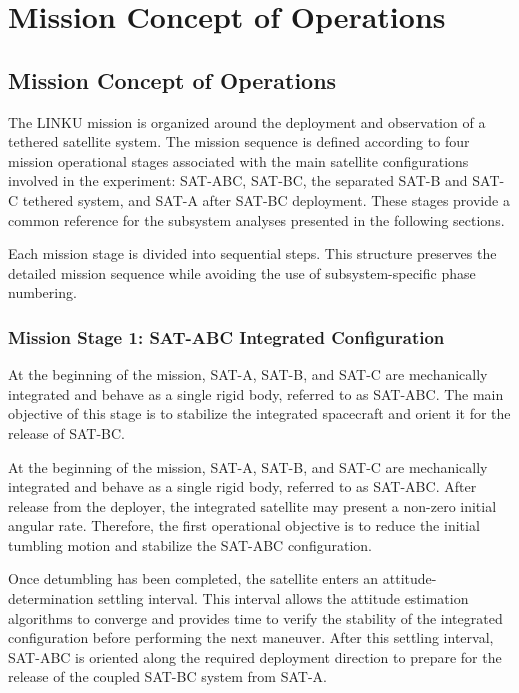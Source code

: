 \chapter{Mission Concept of Operations}

\section{Mission Concept of Operations}
\label{sec:mission_conops}

The LINKU mission is organized around the deployment and observation of a tethered satellite system. The mission sequence is defined according to four mission operational stages associated with the main satellite configurations involved in the experiment: SAT-ABC, SAT-BC, the separated SAT-B and SAT-C tethered system, and SAT-A after SAT-BC deployment. These stages provide a common reference for the subsystem analyses presented in the following sections.

Each mission stage is divided into sequential steps. This structure preserves the detailed mission sequence while avoiding the use of subsystem-specific phase numbering.

\subsection{Mission Stage 1: SAT-ABC Integrated Configuration}
\label{sub:conops_stage1_satabc}

At the beginning of the mission, SAT-A, SAT-B, and SAT-C are mechanically integrated and behave as a single rigid body, referred to as SAT-ABC. The main objective of this stage is to stabilize the integrated spacecraft and orient it for the release of SAT-BC.

At the beginning of the mission, SAT-A, SAT-B, and SAT-C are mechanically integrated and behave as a single rigid body, referred to as SAT-ABC. After release from the deployer, the integrated satellite may present a non-zero initial angular rate. Therefore, the first operational objective is to reduce the initial tumbling motion and stabilize the SAT-ABC configuration.

Once detumbling has been completed, the satellite enters an attitude-determination settling interval. This interval allows the attitude estimation algorithms to converge and provides time to verify the stability of the integrated configuration before performing the next maneuver. After this settling interval, SAT-ABC is oriented along the required deployment direction to prepare for the release of the coupled SAT-BC system from SAT-A.


